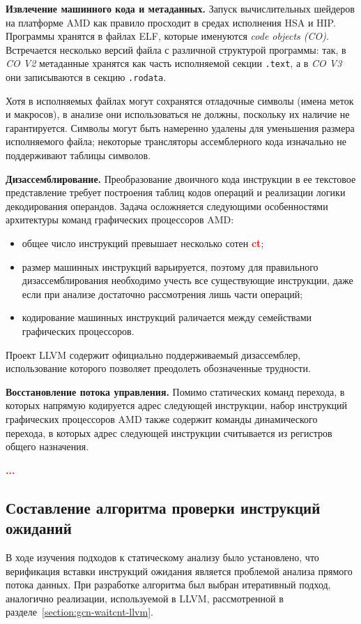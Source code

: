 \documentclass[a4paper,14pt]{extarticle}
\newcommand{\todo}[1]{\textbf{\textcolor{red}{#1}}}
\newcommand{\topic}[1]{\textbf{#1.}}
\newenvironment{ul}{\begin{itemize}[noitemsep,topsep=0em]}{\end{itemize}\vspace{20pt}}
\begin{document}
\topic{Извлечение машинного кода и метаданных} Запуск вычислительных шейдеров на платформе AMD
как правило просходит в средах исполнения HSA и HIP. Программы хранятся в файлах ELF,
которые именуются \textit{code objects (CO)}.
Встречается несколько версий файла с различной структурой программы: так,
в \textit{CO V2} метаданные хранятся как часть исполняемой секции \texttt{.text}, а
в \textit{CO V3} они записываются в секцию \texttt{.rodata}.

Хотя в исполняемых файлах могут сохранятся отладочные символы
(имена меток и макросов), в анализе они использоваться не должны, поскольку их наличие не гарантируется.
Символы могут быть намеренно удалены для уменьшения размера исполняемого файла;
некоторые трансляторы ассемблерного кода изначально не поддерживают таблицы символов.

\topic{Дизассемблирование} Преобразование двоичного кода инструкции в ее текстовое представление
требует построения таблиц кодов операций и реализации логики декодирования операндов.
Задача осложняется следующими особенностями архитектуры команд графических процессоров AMD:
\begin{ul}
\item общее число инструкций превышает несколько сотен \todo{ct};
\item размер машинных инструкций варьируется, поэтому для правильного дизассемблирования необходимо
  учесть все существующие инструкции, даже если при анализе достаточно рассмотрения лишь части операций;
\item кодирование машинных инструкций раличается между семействами графических процессоров.
\end{ul}
Проект LLVM содержит официально поддерживаемый дизассемблер, использование которого позволяет
преодолеть обозначенные трудности.

\topic{Восстановление потока управления} Помимо статических команд перехода, в которых напрямую
кодируется адрес следующей инструкции, набор инструкций графических процессоров AMD также содержит
команды динамического перехода, в которых адрес следующей инструкции считывается из регистров
общего назначения.

\todo{...}

\subsection{Составление алгоритма проверки инструкций ожиданий}

В ходе изучения подходов к статическому анализу было установлено, что верификация
вставки инструкций ожидания является проблемой анализа прямого потока данных.
При разработке алгоритма был выбран итеративный подход, аналогично реализации,
используемой в LLVM, рассмотренной в разделе~\ref{section:gcn-waitcnt-llvm}.
\end{document}
